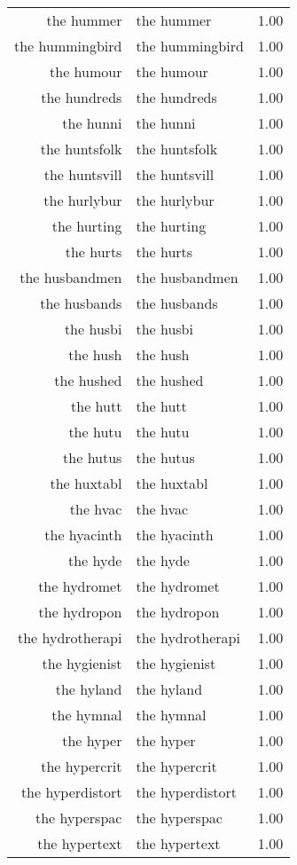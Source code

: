 \begin{table}[ht]
\begin{tabular}{rlr}
  the hummer & the hummer & 1.00 \\ 
  the hummingbird & the hummingbird & 1.00 \\ 
  the humour & the humour & 1.00 \\ 
  the hundreds & the hundreds & 1.00 \\ 
  the hunni & the hunni & 1.00 \\ 
  the huntsfolk & the huntsfolk & 1.00 \\ 
  the huntsvill & the huntsvill & 1.00 \\ 
  the hurlybur & the hurlybur & 1.00 \\ 
  the hurting & the hurting & 1.00 \\ 
  the hurts & the hurts & 1.00 \\ 
  the husbandmen & the husbandmen & 1.00 \\ 
  the husbands & the husbands & 1.00 \\ 
  the husbi & the husbi & 1.00 \\ 
  the hush & the hush & 1.00 \\ 
  the hushed & the hushed & 1.00 \\ 
  the hutt & the hutt & 1.00 \\ 
  the hutu & the hutu & 1.00 \\ 
  the hutus & the hutus & 1.00 \\ 
  the huxtabl & the huxtabl & 1.00 \\ 
  the hvac & the hvac & 1.00 \\ 
  the hyacinth & the hyacinth & 1.00 \\ 
  the hyde & the hyde & 1.00 \\ 
  the hydromet & the hydromet & 1.00 \\ 
  the hydropon & the hydropon & 1.00 \\ 
  the hydrotherapi & the hydrotherapi & 1.00 \\ 
  the hygienist & the hygienist & 1.00 \\ 
  the hyland & the hyland & 1.00 \\ 
  the hymnal & the hymnal & 1.00 \\ 
  the hyper & the hyper & 1.00 \\ 
  the hypercrit & the hypercrit & 1.00 \\ 
  the hyperdistort & the hyperdistort & 1.00 \\ 
  the hyperspac & the hyperspac & 1.00 \\ 
  the hypertext & the hypertext & 1.00 \\ 

\end{tabular}
\end{table}
